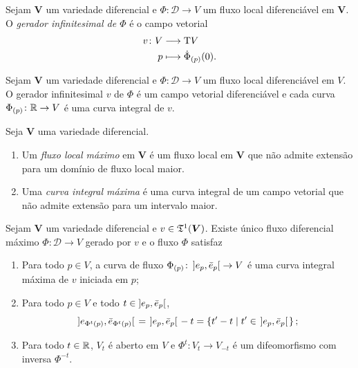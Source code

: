 
\begin{definition}
Sejam $\bm V$ um variedade diferencial e $\Phi\colon \mathscr{D} \to V$ um fluxo local diferenciável em $\bm V$. O \emph{gerador infinitesimal de $\Phi$} é o campo vetorial
	\begin{align*}
	{v}\colon {V} &\longrightarrow {\mathrm{T}V} \\{p} &\longmapsto \dot \Phi_{(p)}(0).
	\end{align*}
\end{definition}

\begin{proposition}
Sejam $\bm V$ um variedade diferencial e $\Phi\colon \mathscr{D} \to V$ um fluxo local diferenciável em $V$. O gerador infinitesimal $v$ de $\Phi$ é um campo vetorial diferenciável e cada curva $\Phi_{(p)}\colon \mathbb{R} \to V$ é uma curva integral de $v$.
\end{proposition}

\begin{definition}
Seja $\bm V$ uma variedade diferencial.
	\begin{enumerate}
	\item Um \emph{fluxo local máximo} em $\bm V$ é um fluxo local em $\bm V$ que não admite extensão para um domínio de fluxo local maior.

	\item Uma \emph{curva integral máxima} é uma curva integral de um campo vetorial que não admite extensão para um intervalo maior.
	\end{enumerate}
\end{definition}

\begin{proposition}
Sejam $\bm V$ um variedade diferencial e $v \in \mathfrak{T}^1(\bm V)$. Existe único fluxo diferencial máximo $\Phi\colon \mathscr{D} \to V$ gerado por $v$ e o fluxo $\Phi$ satisfaz
	\begin{enumerate}
	\item Para todo $p \in V$, a curva de fluxo $\Phi_{(p)}\colon \left]{e_p},{\bar e_p}\right[ \to V$ é uma curva integral máxima de $v$ iniciada em $p$;

	\item Para todo $p \in V$ e todo $t \in \left]{e_p},{\bar e_p}\right[$,
	\begin{equation*}
	\left.]e_{\Phi^t(p)},\bar e_{\Phi^t(p)}[\right. = \left.]e_p,\bar e_p[\right. - t = \left\{{t'-t}\;\middle\vert\;{t' \in \left.]e_p,\bar e_p[\right.}\right\};
	\end{equation*}

	\item Para todo $t \in \mathbb{R}$, $V_t$ é aberto em $V$ e $\Phi^t\colon V_t \to V_{-t}$ é um difeomorfismo com inversa $\Phi^{-t}$.
	\end{enumerate}
\end{proposition}

